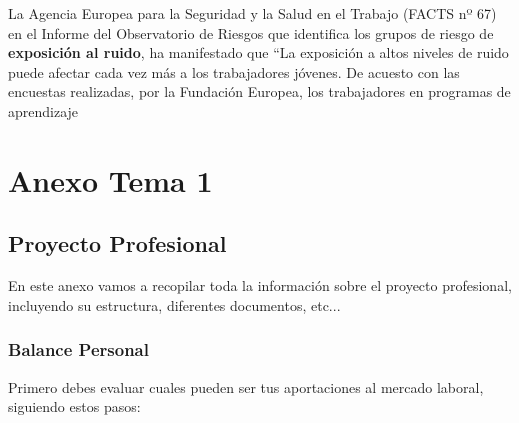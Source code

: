 La Agencia Europea  para la Seguridad y la Salud en el Trabajo (FACTS nº 67) en el Informe del Observatorio de Riesgos que identifica los grupos de riesgo de \textbf{exposición al ruido}, ha manifestado que ``La exposición a altos niveles de ruido puede afectar cada vez más a los trabajadores jóvenes. De acuesto con las encuestas realizadas, por la Fundación Europea, los trabajadores en programas de aprendizaje




\chapter{Anexo Tema 1}

\section{Proyecto Profesional}
En este anexo vamos a recopilar toda la información sobre el proyecto profesional, incluyendo su estructura, diferentes documentos, etc...

\subsection{Balance Personal}
Primero debes evaluar cuales pueden ser tus aportaciones al mercado laboral, siguiendo estos pasos:

